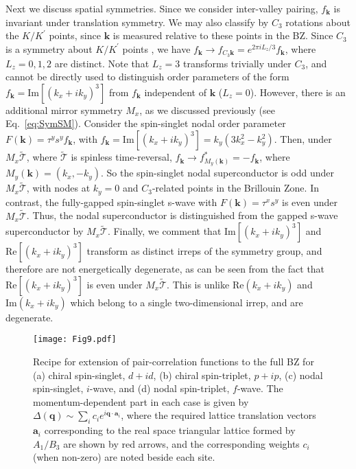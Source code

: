 \documentclass[aps,pra,twocolumn,superscriptaddress,10pt,article,nofootinbib,showpacs,longbibliography]{revtex4-1}
\def \k{{\mathbf k}}
\def \q{{\mathbf q}}
\begin{document}
Next we discuss spatial symmetries. 
Since we consider inter-valley pairing, $f_\k$ is invariant under translation symmetry. 
We may also classify by $C_3$ rotations about the $K/K^\prime$ points, since $\k$ is measured relative to these points in the BZ.
Since $C_3$ is a symmetry about $K/K^\prime$ points \cite{Cvetkovic}, we have $f_\k \to f_{C_3 \k} = e^{2 \pi i L_z/3} f_\k$, where $L_z = 0,1,2$ are distinct. 
Note that $L_z = 3$ transforms trivially under $C_3$, and cannot be directly used to distinguish order parameters of the form $f_\k = \text{Im}[(k_x + i k_y)^3]$ from $f_\k$ independent of $\k$ ($L_z = 0$).
However, there is an additional mirror symmetry $M_x$, as we discussed previously (see Eq.~\eqref{eq:SymSM}). 
Consider the spin-singlet nodal order parameter $F(\k) = \tau^y s^y f_\k$, with $f_\k = \text{Im}[(k_x + i k_y)^3] = k_y(3 k_x^2 - k_y^2)$. 
Then, under $M_x \tilde{\mathcal{T}}$, where $\tilde{\mathcal{T}}$ is spinless time-reversal, $f_\k \to f^*_{M_y(\k)} = -f_{\k}$, where $M_y(\k) = (k_x, - k_y)$. 
So the spin-singlet nodal superconductor is odd under $M_x \tilde{\mathcal{T}}$, with nodes at $k_y = 0$ and $C_3$-related points in the Brillouin Zone.
In contrast, the fully-gapped spin-singlet s-wave with $F(\k) = \tau^x s^y$ is even under $M_x \tilde{\mathcal{T}}$.
Thus, the nodal superconductor is distinguished from the gapped s-wave superconductor by $M_x \tilde{\mathcal{T}}$. 
Finally, we comment that $\text{Im}[(k_x + i k_y)^3]$ and $\text{Re}[(k_x + i k_y)^3]$ transform as distinct irreps of the symmetry group, and therefore are not energetically degenerate, as can be seen from the fact that $\text{Re}[(k_x + i k_y)^3]$ is even under $M_x \tilde{\mathcal{T}}$. This is unlike $\text{Re}(k_x + i k_y)$ and $\text{Im}(k_x + i k_y)$ which belong to a single two-dimensional irrep, and are degenerate. 


\begin{figure}
    \centering
    \texttt{[image: Fig9.pdf]}
    \caption{Recipe for extension of pair-correlation functions to the full BZ for (a) chiral spin-singlet, $d + id$, (b) chiral spin-triplet, $p +ip$, (c) nodal spin-singlet, $i$-wave, and (d) nodal spin-triplet, $f$-wave. The momentum-dependent part in each case is given by $\Delta(\q)\sim \sum_{i} c_i e^{i \q \cdot \mathbf{a}_i}$, where the required lattice translation vectors $\mathbf{a}_i$ corresponding to the real space triangular lattice formed by $A_1/B_3$ are shown by red arrows, and the corresponding weights $c_i$ (when non-zero) are noted beside each site.}
    \label{fig:BZpairings}
\end{figure}
\end{document}
